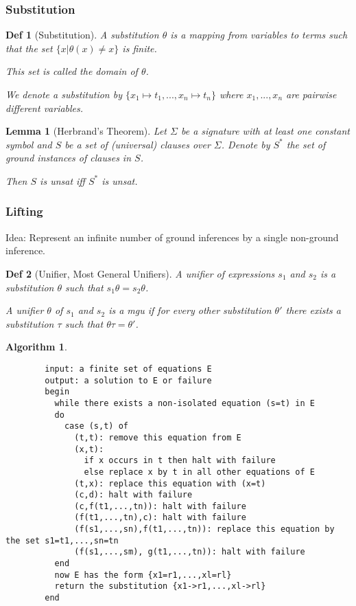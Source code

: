 \documentclass[]{article}
\newtheorem{lemma}{Lemma}
\newtheorem*{definition*}{Def}
\newtheorem{algorithm}{Algorithm}
\begin{document}
\subsubsection{Substitution}

\begin{definition*}[Substitution]
	A substitution $\theta$ is a mapping from variables to terms such that the set $\{x | \theta(x) \not= x\}$ is finite.
	
	This set is called the domain of $\theta$.
	
	We denote a substitution by $\{x_1 \mapsto t_1, ..., x_n \mapsto t_n\}$ where $x_1,...,x_n$ are pairwise different variables.
\end{definition*}

\begin{lemma}[Herbrand's Theorem]
	Let $\Sigma$ be a signature with at least one constant symbol and $S$ be a set of (universal) clauses over $\Sigma$. Denote by $S^*$ the set of ground instances of clauses in $S$.
	
	Then $S$ is unsat iff $S^*$ is unsat.
\end{lemma}

\subsubsection{Lifting}

Idea: Represent an infinite number of ground inferences by a single non-ground inference.

\begin{definition*}[Unifier, Most General Unifiers]
	A unifier of expressions $s_1$ and $s_2$ is a substitution $\theta$ such that $s_1\theta = s_2\theta$.
	
	A unifier $\theta$ of $s_1$ and $s_2$ is a mgu if for every other substitution $\theta'$ there exists a substitution $\tau$ such that $\theta\tau = \theta'$.
\end{definition*}

\begin{algorithm}
	\begin{verbatim}
		input: a finite set of equations E
		output: a solution to E or failure
		begin
		  while there exists a non-isolated equation (s=t) in E
		  do
		    case (s,t) of
		      (t,t): remove this equation from E
		      (x,t):
		        if x occurs in t then halt with failure
		        else replace x by t in all other equations of E
		      (t,x): replace this equation with (x=t)
		      (c,d): halt with failure
		      (c,f(t1,...,tn)): halt with failure
		      (f(t1,...,tn),c): halt with failure
		      (f(s1,...,sn),f(t1,...,tn)): replace this equation by the set s1=t1,...,sn=tn
		      (f(s1,...,sm), g(t1,...,tn)): halt with failure
		  end
		  now E has the form {x1=r1,...,xl=rl}
		  return the substitution {x1->r1,...,xl->rl}
		end
	\end{verbatim}
\end{algorithm}
\end{document}
